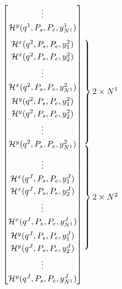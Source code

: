 \begin{equation}
\begin{bmatrix}
 \vdots\\[0.3em]
 \mathcal{H}^y(q^1,P_s,P_e,y^1_{N^1})\\[0.8em]
 \mathcal{H}^x(q^2,P_s,P_e,y^2_{1})\\[0.3em]
 \mathcal{H}^x(q^2,P_s,P_e,y^2_{2})\\[0.3em]
 \vdots\\[0.3em]
 \mathcal{H}^x(q^2,P_s,P_e,y^2_{N^1})\\[0.5em]
 \mathcal{H}^y(q^2,P_s,P_e,y^2_{1})\\[0.3em]
 \mathcal{H}^y(q^2,P_s,P_e,y^2_{2})\\[0.3em]
 \vdots\\[0.3em]
 \mathcal{H}^y(q^2,P_s,P_e,y^2_{N^1})\\[0.8em]
 \vdots\\[0.3em]
 \mathcal{H}^x(q^J,P_s,P_e,y^J_{1})\\[0.3em]
 \mathcal{H}^x(q^J,P_s,P_e,y^J_{2})\\[0.3em]
 \vdots\\[0.3em]
 \mathcal{H}^x(q^J,P_s,P_e,y^J_{N^1})\\[0.5em]
 \mathcal{H}^y(q^J,P_s,P_e,y^J_{1})\\[0.3em]
 \mathcal{H}^y(q^J,P_s,P_e,y^J_{2})\\[0.3em]
 \vdots\\[0.3em]
 \mathcal{H}^y(q^J,P_s,P_e,y^J_{N^1})
\end{bmatrix}
\begin{array}{@{\kern-\nulldelimiterspace}l@{}}
 \left.\begin{array}{@{}c@{}}\\[0.3em] \\[0.3em] \\[0.3em] \\[0.5em] \\[0.3em] \\[0.3em] \\[0.3em] \\[0.8em] \end{array}\right\}2\times N^1\\
 \left.\begin{array}{@{}c@{}}\\[0.3em] \\[0.3em] \\[0.3em] \\[0.5em] \\[0.3em] \\[0.3em] \\[0.3em] \\[0.8em] \end{array}\right\}2\times N^2\\

\end{array}
\end{equation}
